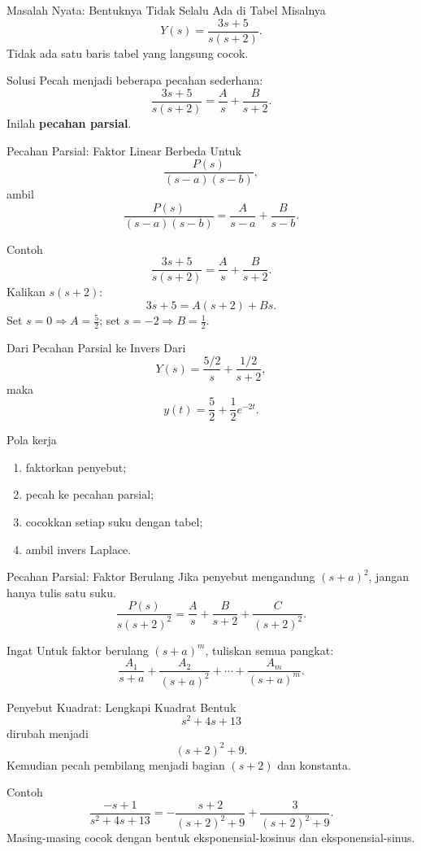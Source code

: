 \documentclass[aspectratio=169,10pt]{beamer}
\begin{document}
\begin{frame}{Masalah Nyata: Bentuknya Tidak Selalu Ada di Tabel}
Misalnya
\[
Y(s)=\frac{3s+5}{s(s+2)}.
\]
Tidak ada satu baris tabel yang langsung cocok.
\vspace{2mm}
\begin{alertblock}{Solusi}
Pecah menjadi beberapa pecahan sederhana:
\[
\frac{3s+5}{s(s+2)}=\frac{A}{s}+\frac{B}{s+2}.
\]
Inilah \textbf{pecahan parsial}.
\end{alertblock}
\end{frame}

\begin{frame}{Pecahan Parsial: Faktor Linear Berbeda}
Untuk
\[
\frac{P(s)}{(s-a)(s-b)},
\]
ambil
\[
\frac{P(s)}{(s-a)(s-b)}=\frac{A}{s-a}+\frac{B}{s-b}.
\]
\begin{exampleblock}{Contoh}
\[
\frac{3s+5}{s(s+2)}=\frac{A}{s}+\frac{B}{s+2}.
\]
Kalikan $s(s+2)$:
\[
3s+5=A(s+2)+Bs.
\]
Set $s=0\Rightarrow A=\frac52$; set $s=-2\Rightarrow B=\frac12$.
\end{exampleblock}
\end{frame}

\begin{frame}{Dari Pecahan Parsial ke Invers}
Dari
\[
Y(s)=\frac{5/2}{s}+\frac{1/2}{s+2},
\]
maka
\[
y(t)=\frac52+\frac12e^{-2t}.
\]
\begin{block}{Pola kerja}
\begin{enumerate}
\item faktorkan penyebut;
\item pecah ke pecahan parsial;
\item cocokkan setiap suku dengan tabel;
\item ambil invers Laplace.
\end{enumerate}
\end{block}
\end{frame}

\begin{frame}{Pecahan Parsial: Faktor Berulang}
Jika penyebut mengandung $(s+a)^2$, jangan hanya tulis satu suku.
\[
\frac{P(s)}{s(s+2)^2}
=\frac{A}{s}+\frac{B}{s+2}+\frac{C}{(s+2)^2}.
\]
\begin{alertblock}{Ingat}
Untuk faktor berulang $(s+a)^m$, tuliskan semua pangkat:
\[
\frac{A_1}{s+a}+\frac{A_2}{(s+a)^2}+\cdots+\frac{A_m}{(s+a)^m}.
\]
\end{alertblock}
\end{frame}

\begin{frame}{Penyebut Kuadrat: Lengkapi Kuadrat}
Bentuk
\[
s^2+4s+13
\]
dirubah menjadi
\[
(s+2)^2+9.
\]
Kemudian pecah pembilang menjadi bagian $(s+2)$ dan konstanta.
\begin{exampleblock}{Contoh}
\[
\frac{-s+1}{s^2+4s+13}
= -\frac{s+2}{(s+2)^2+9}+\frac{3}{(s+2)^2+9}.
\]
Masing-masing cocok dengan bentuk eksponensial-kosinus dan eksponensial-sinus.
\end{exampleblock}
\end{frame}
\end{document}
